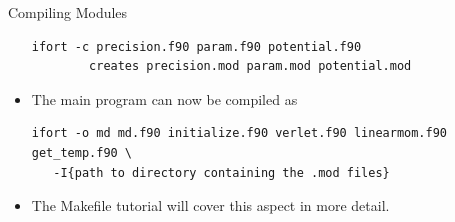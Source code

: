 \documentclass[c,mathserif,compress,xcolor=svgnames]{beamer}
\begin{document}
\begin{frame}{Compiling Modules}
\begin{itemize}
      \begin{Verbatim}[fontsize=\fontsize{6}{7}\selectfont,formatcom=\color{indigo}]
ifort -c precision.f90 param.f90 potential.f90 
        creates precision.mod param.mod potential.mod
      \end{Verbatim}
    \item The main program can now be compiled as
      \begin{Verbatim}[fontsize=\fontsize{6}{7}\selectfont,formatcom=\color{indigo}]
ifort -o md md.f90 initialize.f90 verlet.f90 linearmom.f90 get_temp.f90 \
   -I{path to directory containing the .mod files}
      \end{Verbatim}
    \item The Makefile tutorial will cover this aspect in more detail.
  \end{itemize}
\end{frame}
\end{document}
